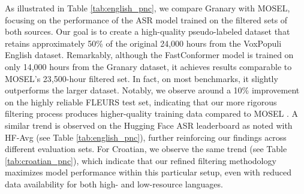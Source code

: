 \begin{table}[ht]
    \centering
    \caption{WER of FastConformer-L on MOSEL and Granary English datasets [\%]}
    \label{tab:english_pnc}
\end{table}



As illustrated in Table \ref{tab:english_pnc}, we compare Granary with MOSEL, focusing on the performance of the ASR model trained on the filtered sets of both sources. Our goal is to create a high-quality pseudo-labeled dataset that retains approximately 50\% of the original 24,000 hours from the VoxPopuli English dataset. Remarkably, although the FastConformer model is trained on only 14,000 hours from the Granary dataset, it achieves results comparable to MOSEL's 23,500-hour filtered set. In fact, on most benchmarks, it slightly outperforms the larger dataset. Notably, we observe around a 10\% improvement on the highly reliable FLEURS test set, indicating that our more rigorous filtering process produces higher-quality training data compared to MOSEL \cite{mosel}.  A similar trend is observed on the Hugging Face ASR leaderboard as noted with HF-Avg (see Table \ref{tab:english_pnc}), further reinforcing our findings across different evaluation sets. For Croatian, we observe the same trend (see Table \ref{tab:croatian_pnc}), which indicate that our refined filtering methodology maximizes model performance within this particular setup, even with reduced data availability for both high- and low-resource languages.


